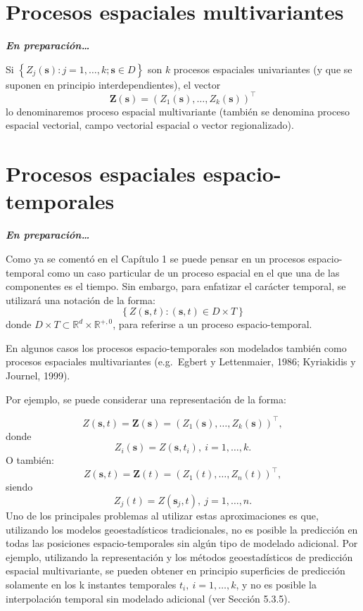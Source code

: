 \documentclass[
  spanish,
]{book}
\theoremstyle{break}
\begin{document}
\hypertarget{multivar}{%
\chapter{Procesos espaciales multivariantes}\label{multivar}}

\textbf{\emph{En preparación\ldots{}}}

Si \(\left\{ Z_{j}(\mathbf{s}):j=1, \ldots, k;\mathbf{s}\in D\right\}\)
son \(k\) procesos espaciales univariantes (y que se suponen en principio interdependientes), el vector
\[\mathbf{Z}(\mathbf{s})=(Z_{1}(\mathbf{s}), \ldots, Z_{k}(\mathbf{s}))^\top\]
lo denominaremos proceso espacial multivariante (también se denomina proceso espacial vectorial, campo vectorial espacial o vector regionalizado).

\hypertarget{esp-temp}{%
\chapter{Procesos espaciales espacio-temporales}\label{esp-temp}}

\textbf{\emph{En preparación\ldots{}}}

Como ya se comentó en el Capítulo 1 se puede pensar en un procesos espacio-temporal como un caso particular de un proceso espacial en el que una de las componentes es el tiempo.
Sin embargo, para enfatizar el carácter temporal, se utilizará una notación de la forma:
\[\left\{ Z(\mathbf{s},t):(\mathbf{s},t)\in D\times T\right\}\]
donde \(D\times T\subset \mathbb{R} ^{d} \times \mathbb{R}^{+,0}\), para
referirse a un proceso espacio-temporal.

En algunos casos los procesos espacio-temporales son modelados también
como procesos espaciales multivariantes (e.g.~Egbert y Lettenmaier,
1986; Kyriakidis y Journel, 1999).

Por ejemplo, se puede considerar una representación de la forma:

\[Z(\mathbf{s},t)=\mathbf{Z}(\mathbf{s})=(Z_{1} (\mathbf{s}), \ldots,Z_{k} (
\mathbf{s}))^\top,\]
donde
\[Z_{i} (\mathbf{s})=Z(\mathbf{s},t_{i} ),\  i=1, \ldots,k.\]
O también:
\[Z(\mathbf{s},t) = \mathbf{Z}(t) =  \left(Z_{1}(t), \ldots, Z_{n}(t) \right)^\top,\]
siendo
\[Z_{j} (t)=Z(\mathbf{s}_{j} ,t),\  j=1, \ldots,n.\]
Uno de los principales problemas al utilizar estas aproximaciones es que, utilizando los modelos geoestadísticos tradicionales, no es posible la
predicción en todas las posiciones espacio-temporales sin algún tipo de
modelado adicional. Por ejemplo, utilizando la representación y los métodos geoestadísticos de predicción espacial multivariante, se pueden obtener en principio superficies de predicción solamente en los k instantes temporales \(t_{i} ,\  i=1, \ldots, k\),
y no es posible la interpolación temporal sin modelado adicional (ver Sección 5.3.5).
\end{document}

